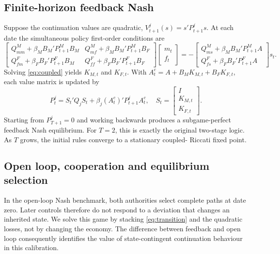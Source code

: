 \documentclass[11pt]{article}
\begin{document}
\subsection{Finite-horizon feedback Nash}

Suppose the continuation values are quadratic,
$V^j_{t+1}(s)=s'P^j_{t+1}s$.  At each date the simultaneous policy first-order
conditions are
\begin{equation}
 \begin{bmatrix}
 Q^M_{mm}+\beta_M B_M'P^M_{t+1}B_M &
 Q^M_{mf}+\beta_M B_M'P^M_{t+1}B_F\\
 Q^F_{fm}+\beta_F B_F'P^F_{t+1}B_M &
 Q^F_{ff}+\beta_F B_F'P^F_{t+1}B_F
 \end{bmatrix}
 \begin{bmatrix}m_t\\f_t\end{bmatrix}
 =-
 \begin{bmatrix}
 Q^M_{ms}+\beta_M B_M'P^M_{t+1}A\\
 Q^F_{fs}+\beta_F B_F'P^F_{t+1}A
 \end{bmatrix}s_t.                                     \label{eq:coupled}
\end{equation}
Solving \eqref{eq:coupled} yields $K_{M,t}$ and $K_{F,t}$.  With
$A_t^c=A+B_MK_{M,t}+B_FK_{F,t}$, each value matrix is updated by
\begin{equation}
 P^j_t=S_t'Q_jS_t+\beta_j(A_t^c)'P^j_{t+1}A_t^c,
 \quad
 S_t=\begin{bmatrix}I\\K_{M,t}\\K_{F,t}\end{bmatrix}. \label{eq:riccati}
\end{equation}
Starting from $P^j_{T+1}=0$ and working backwards produces a subgame-perfect
feedback Nash equilibrium.  For $T=2$, this is exactly the original two-stage
logic.  As $T$ grows, the initial rules converge to a stationary coupled-
Riccati fixed point.

\subsection{Open loop, cooperation and equilibrium selection}

In the open-loop Nash benchmark, both authorities select complete paths at
date zero.  Later controls therefore do not respond to a deviation that changes
an inherited state.  We solve this game by stacking \eqref{eq:transition} and
the quadratic losses, not by changing the economy.  The difference between
feedback and open loop consequently identifies the value of state-contingent
continuation behaviour in this calibration.
\end{document}
